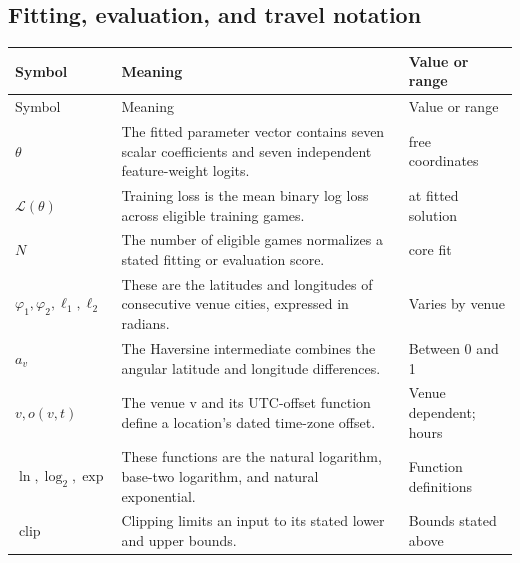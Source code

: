 \documentclass[11pt]{article}
\begin{document}
\subsection*{Fitting, evaluation, and travel notation}
\begin{longtable}{@{}>{\raggedright\arraybackslash}p{}>{\raggedright\arraybackslash}p{}>{\raggedright\arraybackslash}p{}@{}}
\toprule
Symbol & Meaning & Value or range\\
\midrule
\endfirsthead
\toprule
Symbol & Meaning & Value or range\\
\midrule
\endhead
\bottomrule
\endfoot
$\theta$ & The fitted parameter vector contains seven scalar coefficients and seven independent feature-weight logits. & 14 free coordinates\\
$\mathcal L(\theta)$ & Training loss is the mean binary log loss across eligible training games. & 0.6159695469 at fitted solution\\
$N$ & The number of eligible games normalizes a stated fitting or evaluation score. & 5370 core fit\\
$\varphi_1,\varphi_2,\ell_1,\ell_2$ & These are the latitudes and longitudes of consecutive venue cities, expressed in radians. & Varies by venue\\
$a_v$ & The Haversine intermediate combines the angular latitude and longitude differences. & Between 0 and 1\\
$v,o(v,t)$ & The venue v and its UTC-offset function define a location's dated time-zone offset. & Venue dependent; hours\\
$\ln,\log_2,\exp$ & These functions are the natural logarithm, base-two logarithm, and natural exponential. & Function definitions\\
$\operatorname{clip}$ & Clipping limits an input to its stated lower and upper bounds. & Bounds stated above\\
\end{longtable}

\clearpage
\end{document}
